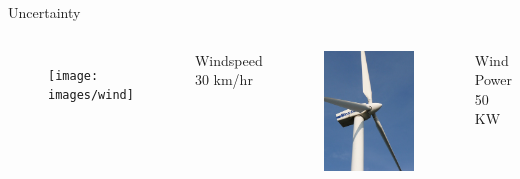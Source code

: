 \begin{frame}{Uncertainty }
\begin{columns}

\begin{figure}[ht]
\texttt{[image: images/wind]}
\end{figure}
Windspeed \\30 km/hr
\pause
{}
\begin{figure}[ht]
\includegraphics[width=\textwidth]{images/windmill}
\end{figure}
Wind Power \\ 50 KW


\end{columns}
\end{frame}
